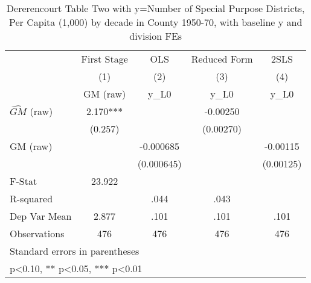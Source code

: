 \begin{table}[htbp]\centering
\def\sym#1{\ifmmode^{#1}\else\(^{#1}\)\fi}
\caption{Dererencourt Table Two with y=Number of Special Purpose Districts, Per Capita (1,000) by decade in County 1950-70, with baseline y and division FEs}
\begin{tabular}{l*{4}{c}}
\toprule
                    & First Stage   &         OLS   &Reduced Form   &        2SLS   \\
                    &\multicolumn{1}{c}{(1)}&\multicolumn{1}{c}{(2)}&\multicolumn{1}{c}{(3)}&\multicolumn{1}{c}{(4)}\\
                    &\multicolumn{1}{c}{GM  (raw)}&\multicolumn{1}{c}{y\_L0}&\multicolumn{1}{c}{y\_L0}&\multicolumn{1}{c}{y\_L0}\\
\midrule
$\hat{GM}$ (raw)    &       2.170***&               &    -0.00250   &               \\
                    &     (0.257)   &               &   (0.00270)   &               \\
\addlinespace
GM  (raw)           &               &   -0.000685   &               &    -0.00115   \\
                    &               &  (0.000645)   &               &   (0.00125)   \\
\midrule
F-Stat              &      23.922   &               &               &               \\
R-squared           &               &        .044   &        .043   &               \\
Dep Var Mean        &       2.877   &        .101   &        .101   &        .101   \\
Observations        &         476   &         476   &         476   &         476   \\
\bottomrule
\multicolumn{5}{l}{\footnotesize Standard errors in parentheses}\\
\multicolumn{5}{l}{\footnotesize * p<0.10, ** p<0.05, *** p<0.01}\\
\end{tabular}
\end{table}
